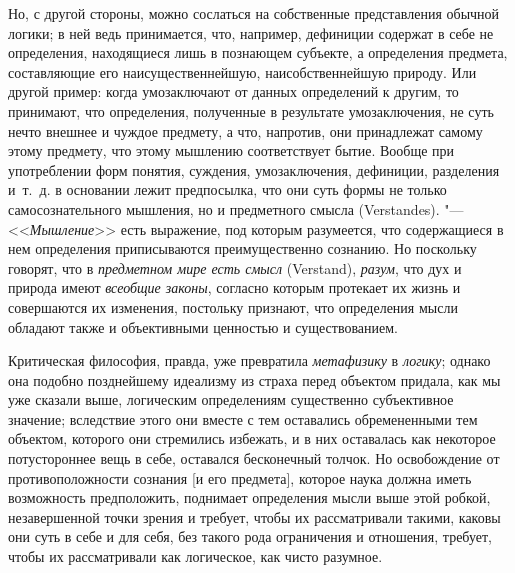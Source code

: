 Но, с другой стороны, можно сослаться на собственные представления обычной
логики; в ней ведь принимается, что, например, дефиниции содержат в себе не
определения, находящиеся лишь в познающем субъекте, а определения предмета,
составляющие его наисущественнейшую, наисобственнейшую природу. Или другой
пример: когда умозаключают от данных определений к другим, то принимают,
что определения, полученные в результате умозаключения, не суть нечто
внешнее и чуждое предмету, а что, напротив, они принадлежат самому этому
предмету, что этому мышлению соответствует бытие. Вообще при употреблении
форм понятия, суждения, умозаключения, дефиниции, разделения и~т.~д. в
основании лежит предпосылка, что они суть формы не только самосознательного
мышления, но и предметного смысла (Verstandes). "---
<<{\em Мышление}>> есть выражение, под которым
разумеется, что содержащиеся в нем определения приписываются
преимущественно сознанию. Но поскольку говорят, что в
{\em предметном мире есть смысл} (Verstand),
{\em разум}, что дух и природа имеют
{\em всеобщие законы}, согласно которым протекает их
жизнь и совершаются их изменения, постольку признают, что определения мысли
обладают также и объективными ценностью и существованием.

Критическая философия, правда, уже превратила
{\em метафизику} в {\em логику};
однако она подобно позднейшему
идеализму
из страха перед объектом придала, как мы уже сказали выше, логическим
определениям существенно субъективное значение; вследствие этого они вместе
с тем оставались обремененными тем объектом, которого они стремились
избежать, и в них оставалась как некоторое потустороннее вещь в себе,
оставался бесконечный толчок. Но освобождение от противоположности сознания
[и его предмета], которое наука должна иметь возможность предположить,
поднимает определения мысли выше этой робкой, незавершенной точки зрения и
требует, чтобы их рассматривали такими, каковы они суть в себе и для себя,
без такого рода ограничения и отношения, требует, чтобы их рассматривали
как логическое, как чисто разумное.

